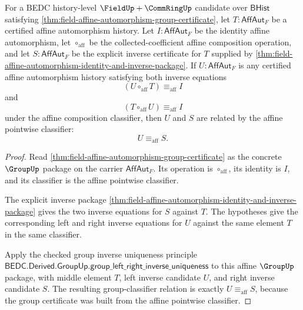 \begin{theorem}
\label{thm:field-affine-automorphism-inverse-unique}
For a BEDC history-level $\FieldUp+\CommRingUp$ candidate over
$\mathsf{BHist}$ satisfying
\autoref{thm:field-affine-automorphism-group-certificate}, let
$T:\mathsf{AffAut}_F$ be a certified affine automorphism history. Let
$I:\mathsf{AffAut}_F$ be the identity affine automorphism, let
$\circ_{\mathrm{aff}}$ be the collected-coefficient affine composition
operation, and let $S:\mathsf{AffAut}_F$ be the explicit inverse certificate
for $T$ supplied by
\autoref{thm:field-affine-automorphism-identity-and-inverse-package}. If
$U:\mathsf{AffAut}_F$ is any certified affine automorphism history satisfying
both inverse equations
$$
(U\circ_{\mathrm{aff}}T)\equiv_{\mathrm{aff}} I
$$
and
$$
(T\circ_{\mathrm{aff}}U)\equiv_{\mathrm{aff}} I
$$
under the affine composition classifier, then $U$ and $S$ are related by the
affine pointwise classifier:
$$
U\equiv_{\mathrm{aff}} S.
$$
\end{theorem}
\begin{proof}
Read \autoref{thm:field-affine-automorphism-group-certificate} as the concrete
$\GroupUp$ package on the carrier $\mathsf{AffAut}_F$. Its operation is
$\circ_{\mathrm{aff}}$, its identity is $I$, and its classifier is the affine
pointwise classifier.

The explicit inverse package
\autoref{thm:field-affine-automorphism-identity-and-inverse-package} gives the
two inverse equations for $S$ against $T$. The hypotheses give the corresponding
left and right inverse equations for $U$ against the same element $T$ in the
same classifier.

Apply the checked group inverse uniqueness principle
$\mathsf{BEDC.Derived.GroupUp.group\_left\_right\_inverse\_uniqueness}$ to this
affine $\GroupUp$ package, with middle element $T$, left inverse candidate $U$,
and right inverse candidate $S$. The resulting group-classifier relation is
exactly $U\equiv_{\mathrm{aff}}S$, because the group certificate was built from
the affine pointwise classifier.
\end{proof}
